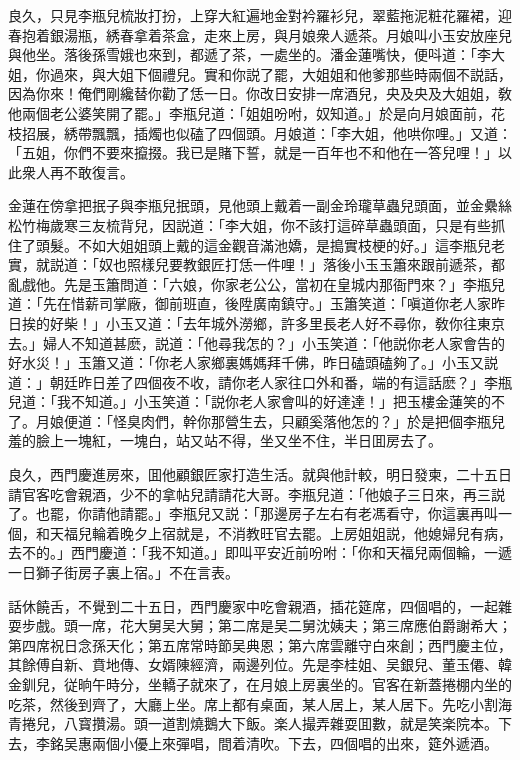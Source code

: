 良久，只見李瓶兒梳妝打扮，上穿大紅遍地金對衿羅衫兒，翠藍拖泥粧花羅裙，迎春抱着銀湯瓶，綉春拿着茶盒，走來上房，與月娘衆人遞茶。月娘叫小玉安放座兒與他坐。落後孫雪娥也來到，都遞了茶，一處坐的。潘金蓮嘴快，便呌道：「李大姐，你過來，與大姐下個禮兒。實和你説了罷，大姐姐和他爹那些時兩個不説話，因為你來！俺們剛纔替你勸了恁一日。你改日安排一席酒兒，央及央及大姐姐，敎他兩個老公婆笑開了罷。」李瓶兒道：「姐姐吩咐，奴知道。」於是向月娘面前，花枝招展，綉帶飄飄，插燭也似磕了四個頭。月娘道：「李大姐，他哄你哩。」又道：「五姐，你們不要來攛掇。我已是賭下誓，就是一百年也不和他在一答兒哩！」以此衆人再不敢復言。

金蓮在傍拿把抿子與李瓶兒抿頭，見他頭上戴着一副金玲瓏草蟲兒頭面，並金纍絲松竹梅歲寒三友梳背兒，因説道：「李大姐，你不該打這碎草蟲頭面，只是有些抓住了頭髮。不如大姐姐頭上戴的這金觀音滿池嬌，是搗實枝梗的好。」這李瓶兒老實，就説道：「奴也照樣兒要教銀匠打恁一件哩！」落後小玉玉簫來跟前遞茶，都亂戲他。先是玉簫問道：「六娘，你家老公公，當初在皇城内那衙門來？」李瓶兒道：「先在惜薪司掌廠，御前班直，後陞廣南鎮守。」玉簫笑道：「嗔道你老人家昨日挨的好柴！」小玉又道：「去年城外澇鄉，許多里長老人好不尋你，敎你往東京去。」婦人不知道甚麽，説道：「他尋我怎的？」小玉笑道：「他説你老人家會告的好水災！」玉簫又道：「你老人家鄉裏媽媽拜千佛，昨日磕頭磕夠了。」小玉又説道：」朝廷昨日差了四個夜不收，請你老人家往口外和番，端的有這話麽？」李瓶兒道：「我不知道。」小玉笑道：「説你老人家會叫的好達達！」把玉樓金蓮笑的不了。月娘便道：「怪臭肉們，幹你那營生去，只顧奚落他怎的？」於是把個李瓶兒羞的臉上一塊紅，一塊白，站又站不得，坐又坐不住，半日囬房去了。

良久，西門慶進房來，囬他顧銀匠家打造生活。就與他計較，明日發柬，二十五日請官客吃會親酒，少不的拿帖兒請請花大哥。李瓶兒道：「他娘子三日來，再三説了。也罷，你請他請罷。」李瓶兒又説：「那邊房子左右有老馮看守，你這裏再叫一個，和天福兒輪着晚夕上宿就是，不消教旺官去罷。上房姐姐説，他媳婦兒有病，去不的。」西門慶道：「我不知道。」即叫平安近前吩咐：「你和天福兒兩個輪，一遞一日獅子街房子裏上宿。」不在言表。

話休饒舌，不覺到二十五日，西門慶家中吃會親酒，插花筵席，四個唱的，一起雜耍步戲。頭一席，花大舅吴大舅；第二席是吴二舅沈姨夫；第三席應伯爵謝希大；第四席祝日念孫天化；第五席常時節吴典恩；第六席雲離守白來創；西門慶主位，其餘傅自新、賁地傳、女婿陳經濟，兩邊列位。先是李桂姐、吴銀兒、董玉僊、韓金釧兒，従晌午時分，坐轎子就來了，在月娘上房裏坐的。官客在新蓋捲棚内坐的吃茶，然後到齊了，大廳上坐。席上都有桌面，某人居上，某人居下。先吃小割海青捲兒，八寳攢湯。頭一道割燒鵝大下飯。楽人撮弄雜耍囬數，就是笑楽院本。下去，李銘吴惠兩個小優上來彈唱，間着清吹。下去，四個唱的出來，筵外遞酒。

